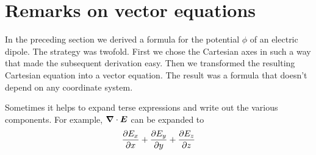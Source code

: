 \section{Remarks on vector equations}

In the preceding section we derived a formula for the potential $\phi$ of an electric dipole.
The strategy was twofold.
First we chose the Cartesian axes in such a way that made the subsequent derivation easy.
Then we transformed the resulting Cartesian equation into a vector equation.
The result was a formula that doesn't depend on any coordinate system.

Sometimes it helps to expand terse expressions and write out the various components.
For example, $\boldsymbol{\nabla}\cdot\boldsymbol{E}$ can be expanded to
\begin{equation*}
  \frac{\partial E_x}{\partial x} + \frac{\partial E_y}{\partial y} + \frac{\partial E_z}{\partial z}
\end{equation*}

